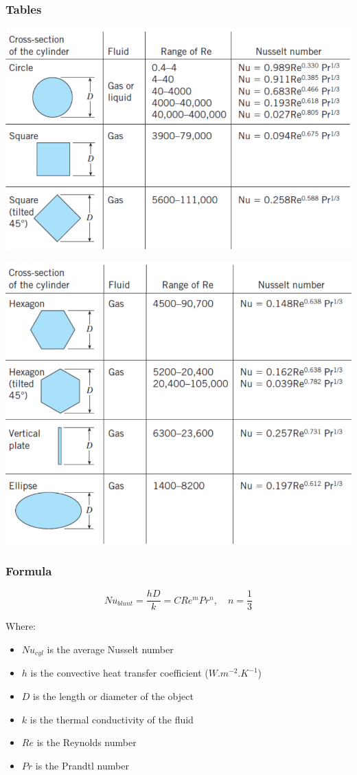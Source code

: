 \documentclass[11pt]{article}
\begin{document}
\subsubsection{Tables}
\label{sec:org8387dfa}
\begin{center}
\includegraphics[width=.9\linewidth]{./images/average-nusselt-number-blunt-bodies-page-1.png}
\end{center}
\begin{center}
\includegraphics[width=.9\linewidth]{./images/average-nusselt-number-blunt-bodies-page-2.png}
\end{center}
\subsubsection{Formula}
\label{sec:orge23a3e5}
\[Nu_{blunt} = \frac{hD}{k} = C Re^m Pr^n, \quad n = \frac{1}{3}\]

Where:
\begin{itemize}
\item \(Nu_{cyl}\) is the average Nusselt number
\item \(h\) is the convective heat transfer coefficient (\(\unit{W.m^{-2}.K^{-1}}\))
\item \(D\) is the length or diameter of the object
\item \(k\) is the thermal conductivity of the fluid
\item \(Re\) is the Reynolds number
\item \(Pr\) is the Prandtl number
\end{itemize}
\end{document}
